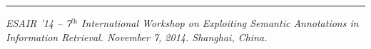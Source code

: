 \documentclass[a0,portrait,final]{a0poster}
\newcommand{\pbox}[3]{
	\begin{center}
	\psshadowbox[linewidth=2mm,framearc=0.1,framesep=1em,shadowsize=4mm,shadowcolor=lightgray,linecolor=#2]{
		\begin{minipage}[t][][t]{#1}{
			#3 %
		}\end{minipage}
	}
	\end{center}
}
\newlength\ptitlespace
\newcommand{\ptitle}[1]{
	\vspace{\ptitlespace}
	\pbox{0.92\columnwidth}{arancioneisti}{
		\begin{center}
		\textsc{\LARGE\bluisti{#1}} %
		\end{center}
	}
	\vspace{0.5\ptitlespace}
}
\begin{document}
\begin{multicols}{2}
%
%
%
%
%

\end{multicols}
\vfill
\centering
\begin{minipage}[c]{\textwidth}
\rule{\textwidth}{1pt}
\textit{ESAIR '14  -- 7$^\textit{th}$ International Workshop on Exploiting Semantic Annotations in Information Retrieval. November 7, 2014. Shanghai, China.}
\end{minipage}
\end{document}
